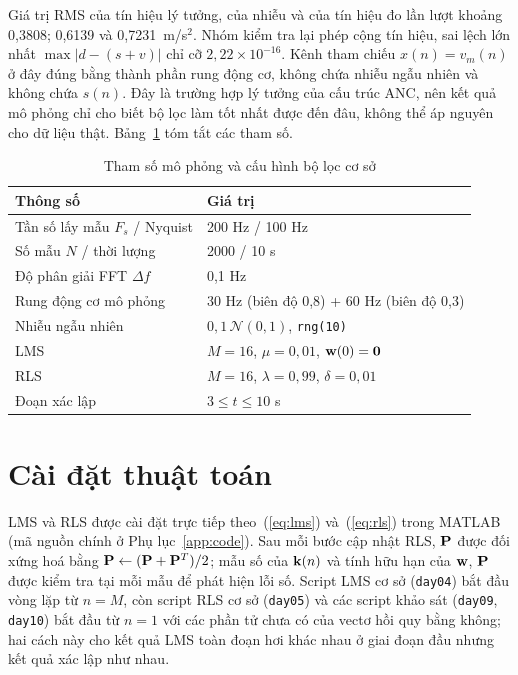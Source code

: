 \documentclass[../main.tex]{subfiles}
\begin{document}
Giá trị RMS của tín hiệu lý tưởng, của nhiễu và của tín hiệu đo lần lượt khoảng 0,3808; 0,6139 và 0,7231~m/s$^2$. Nhóm kiểm tra lại phép cộng tín hiệu, sai lệch lớn nhất $\max|d-(s+v)|$ chỉ cỡ $2{,}22\times10^{-16}$. Kênh tham chiếu $x(n)=v_m(n)$ ở đây đúng bằng thành phần rung động cơ, không chứa nhiễu ngẫu nhiên và không chứa $s(n)$. Đây là trường hợp lý tưởng của cấu trúc ANC, nên kết quả mô phỏng chỉ cho biết bộ lọc làm tốt nhất được đến đâu, không thể áp nguyên cho dữ liệu thật. Bảng~\ref{tab:simparam} tóm tắt các tham số.

\begin{table}[htbp]
\centering
\caption{Tham số mô phỏng và cấu hình bộ lọc cơ sở}
\label{tab:simparam}
\begin{tabular}{@{}ll@{}}
\toprule
\textbf{Thông số} & \textbf{Giá trị} \\
\midrule
Tần số lấy mẫu $F_s$ / Nyquist & 200 Hz / 100 Hz \\
Số mẫu $N$ / thời lượng & 2000 / 10 s \\
Độ phân giải FFT $\Delta f$ & 0,1 Hz \\
Rung động cơ mô phỏng & 30 Hz (biên độ 0,8) + 60 Hz (biên độ 0,3) \\
Nhiễu ngẫu nhiên & $0{,}1\,\mathcal{N}(0,1)$, \texttt{rng(10)} \\
LMS & $M=16$, $\mu=0{,}01$, $\mathbf{w}(0)=\mathbf{0}$ \\
RLS & $M=16$, $\lambda=0{,}99$, $\delta=0{,}01$ \\
Đoạn xác lập & $3\le t\le 10$ s \\
\bottomrule
\end{tabular}
\end{table}

\section{Cài đặt thuật toán}

LMS và RLS được cài đặt trực tiếp theo~(\ref{eq:lms}) và~(\ref{eq:rls}) trong MATLAB (mã nguồn chính ở Phụ lục~\ref{app:code}). Sau mỗi bước cập nhật RLS, $\mathbf{P}$ được đối xứng hoá bằng $\mathbf{P}\leftarrow(\mathbf{P}+\mathbf{P}^T)/2$; mẫu số của $\mathbf{k}(n)$ và tính hữu hạn của $\mathbf{w}$, $\mathbf{P}$ được kiểm tra tại mỗi mẫu để phát hiện lỗi số. Script LMS cơ sở (\texttt{day04}) bắt đầu vòng lặp từ $n=M$, còn script RLS cơ sở (\texttt{day05}) và các script khảo sát (\texttt{day09}, \texttt{day10}) bắt đầu từ $n=1$ với các phần tử chưa có của vectơ hồi quy bằng không; hai cách này cho kết quả LMS toàn đoạn hơi khác nhau ở giai đoạn đầu nhưng kết quả xác lập như nhau.
\end{document}
